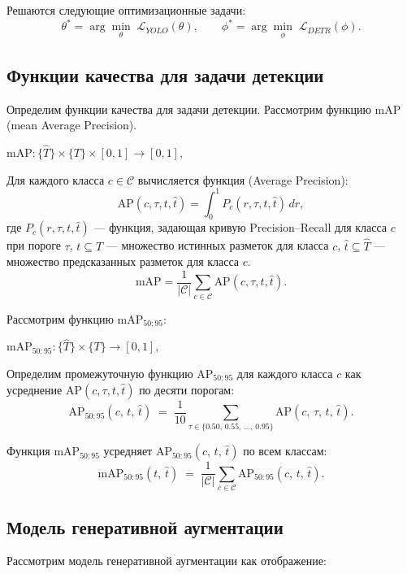 Решаются следующие оптимизационные задачи:
\[
\theta^* = \arg\min_{\theta}\;\mathcal{L}_{YOLO}(\theta),
\qquad
\phi^* = \arg\min_{\phi}\;\mathcal{L}_{DETR}(\phi).
\]


\subsection{Функции качества для задачи детекции}
Определим функции качества для задачи детекции.
Рассмотрим функцию $\text{mAP}$ (mean Average Precision).
\begin{center}
   $\text{mAP}: \{ \hat{T} \}  \times \{ T \} \times [0,1] \to [0,1]$,
\end{center}



Для каждого класса \(c \in \mathcal{C}\) вычисляется функция  (Average Precision):
\[
\text{AP}(c, \tau, t, \hat{t}) = \int_{0}^{1} P_c(r, \tau, t, \hat{t}) \, dr,
\]
где \(P_c(r, \tau, t, \hat{t})\) --- функция, задающая кривую Precision–Recall для класса \(c\) при пороге $\tau$, $t \subseteq T$ — множество истинных разметок для класса \(c\), $\hat{t} \subseteq \hat{T}$ — множество предсказанных разметок для класса \(c\).
\[
\text{mAP} = \frac{1}{|\mathcal{C}|} \sum_{c \in \mathcal{C}} \text{AP}(c, \tau, t, \hat{t}).
\]

Рассмотрим функцию $\text{mAP}_{50:95}$:
\begin{center}
   $\text{mAP}_{50:95}:  \{ \hat{T} \}  \times \{ T \} \to [0,1]$,
\end{center}

Определим промежуточную функцию $\text{AP}_{50:95}$ для каждого класса $c$ как усреднение $\text{AP}(c, \tau, t, \hat{t})$ по десяти порогам:
\[
\text{AP}_{50:95}(c,\,t,\,\hat{t})
\;=\;
\frac{1}{10} 
\sum_{\tau \in \{0.50,\,0.55,\,\dots,\,0.95\}}
\text{AP}(c,\,\tau,\,t,\,\hat{t}).
\]

Функция $\text{mAP}_{50:95}$ усредняет $\text{AP}_{50:95}(c,\,t,\,\hat{t})$ по всем классам:
\[
\text{mAP}_{50:95}(t,\,\hat{t})
\;=\;
\frac{1}{|\mathcal{C}|}
\sum_{c \in \mathcal{C}}
\text{AP}_{50:95}(c,\,t,\,\hat{t}).
\]
\subsection{Модель генеративной аугментации}

Рассмотрим модель генеративной аугментации как отображение:

